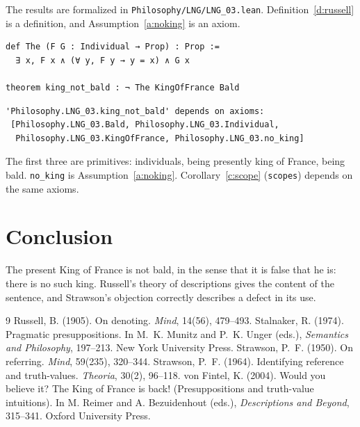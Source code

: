 \documentclass{situationist-preprint}
\begin{document}
The results are formalized in \nolinkurl{Philosophy/LNG/LNG_03.lean}. Definition~\ref{d:russell} is a definition, and Assumption~\ref{a:noking} is an axiom.

\begin{lstlisting}
def The (F G : Individual → Prop) : Prop :=
  ∃ x, F x ∧ (∀ y, F y → y = x) ∧ G x

theorem king_not_bald : ¬ The KingOfFrance Bald
\end{lstlisting}

\begin{lstlisting}
'Philosophy.LNG_03.king_not_bald' depends on axioms:
 [Philosophy.LNG_03.Bald, Philosophy.LNG_03.Individual,
  Philosophy.LNG_03.KingOfFrance, Philosophy.LNG_03.no_king]
\end{lstlisting}

The first three are primitives: individuals, being presently king of France, being bald. \lstinline{no_king} is Assumption~\ref{a:noking}. Corollary~\ref{c:scope} (\lstinline{scopes}) depends on the same axioms.

\section{Conclusion}

The present King of France is not bald, in the sense that it is false that he is: there is no such king. Russell's theory of descriptions gives the content of the sentence, and Strawson's objection correctly describes a defect in its use.

\begin{thebibliography}{9}\small
{} Russell, B. (1905). On denoting. \emph{Mind}, 14(56), 479--493.
 Stalnaker, R. (1974). Pragmatic presuppositions. In M.~K. Munitz and P.~K. Unger (eds.), \emph{Semantics and Philosophy}, 197--213. New York University Press.
 Strawson, P.~F. (1950). On referring. \emph{Mind}, 59(235), 320--344.
 Strawson, P.~F. (1964). Identifying reference and truth-values. \emph{Theoria}, 30(2), 96--118.
 von Fintel, K. (2004). Would you believe it? The King of France is back! (Presuppositions and truth-value intuitions). In M. Reimer and A. Bezuidenhout (eds.), \emph{Descriptions and Beyond}, 315--341. Oxford University Press.
\end{thebibliography}
\end{document}
